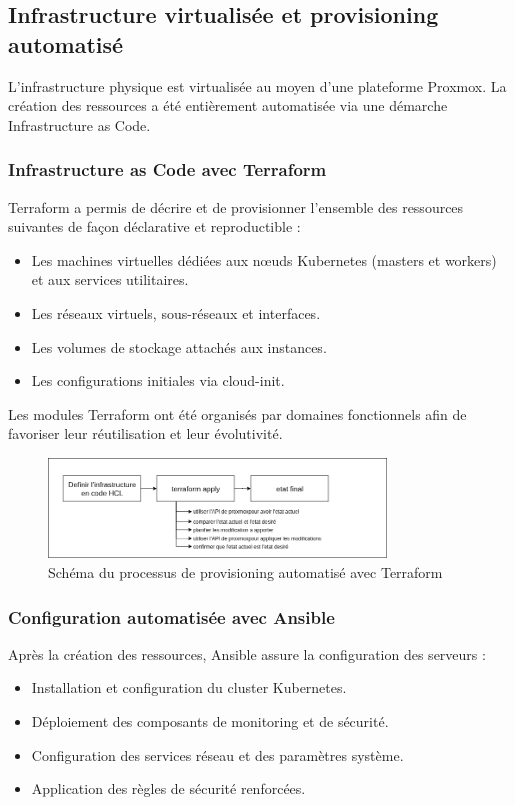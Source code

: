 \subsection{Infrastructure virtualisée et provisioning automatisé}

L'infrastructure physique est virtualisée au moyen d'une plateforme Proxmox. La création des ressources a été entièrement automatisée via une démarche Infrastructure as Code.

\subsubsection*{Infrastructure as Code avec Terraform}

Terraform a permis de décrire et de provisionner l'ensemble des ressources suivantes de façon déclarative et reproductible :
\begin{itemize}
	\item Les machines virtuelles dédiées aux nœuds Kubernetes (masters et workers) et aux services utilitaires.
	\item Les réseaux virtuels, sous-réseaux et interfaces.
	\item Les volumes de stockage attachés aux instances.
	\item Les configurations initiales via cloud-init.
\end{itemize}

Les modules Terraform ont été organisés par domaines fonctionnels afin de favoriser leur réutilisation et leur évolutivité.

\begin{figure}[H]
	\centering
	\includegraphics[width=0.8\textwidth]{figures/terraform-provisioning.png}
	\caption{Schéma du processus de provisioning automatisé avec Terraform}
\end{figure}

\subsubsection*{Configuration automatisée avec Ansible}

Après la création des ressources, Ansible assure la configuration des serveurs :
\begin{itemize}
	\item Installation et configuration du cluster Kubernetes.
	\item Déploiement des composants de monitoring et de sécurité.
	\item Configuration des services réseau et des paramètres système.
	\item Application des règles de sécurité renforcées.
\end{itemize}

